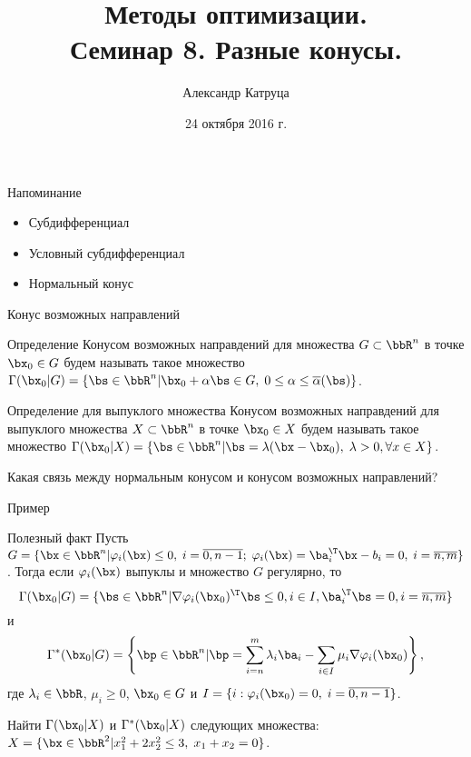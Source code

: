 \documentclass[12pt,russian]{beamer}
\title[Семинар 8]{Методы оптимизации. \\
 Семинар 8. Разные конусы.}
\author{Александр Катруца}
\institute{Московский физико-технический институт,\\
Факультет Управления и Прикладной Математики}
\date{24 октября 2016 г.}
\begin{document}
\begin{frame}
\maketitle
\end{frame}

\begin{frame}{Напоминание}
\begin{itemize}
\item Субдифференциал
\item Условный субдифференциал
\item Нормальный конус
\end{itemize}
\end{frame}

\begin{frame}{Конус возможных направлений}

\begin{block}{Определение}
Конусом возможных направдений для множества $G \subset \bbR^n$ в точке $\bx_0 \in G$ будем называть такое множество $\Gamma(\bx_0 | G) = \{ \bs \in \bbR^n | \bx_0 + \alpha\bs \in G, \; 0 \leq \alpha \leq \overline{\alpha}(\bs) \}$.
\end{block}

\begin{block}{Определение для выпуклого множества}
Конусом возможных направдений для выпуклого множества $X \subset \bbR^n$ в точке $\bx_0 \in X$ будем называть такое множество $\Gamma(\bx_0 | X) = \{ \bs \in \bbR^n | \bs = \lambda (\bx - \bx_0), \; \lambda > 0, \forall x \in X \}$.
\end{block}
Какая связь между нормальным конусом и конусом возможных направлений?

\end{frame}

\begin{frame}{Пример}
\begin{block}{Полезный факт}
Пусть $G = \{ \bx \in \bbR^n | \varphi_i(\bx) \leq 0, \; i = \overline{0,n-1}; \; \varphi_i(\bx) = \ba_i^{\T}\bx - b_i = 0, \; i = \overline{n, m} \}$. Тогда если $\varphi_i(\bx)$ выпуклы и множество $G$ регулярно, то \vspace{-4mm}
\[
\Gamma(\bx_0|G) = \{ \bs \in \bbR^n | \nabla \varphi_i(\bx_0)^{\T} \bs \leq 0, i \in I, \ba^{\T}_i \bs = 0, i = \overline{n,m} \}
\vspace{-4mm}
\]
и \vspace{-4mm}
\[
\Gamma^*(\bx_0|G) = \left \{ \bp \in \bbR^n | \bp = \sum\limits_{i = n}^m \lambda_i\ba_i - \sum\limits_{i \in I} \mu_i \nabla\varphi_i(\bx_0) \right \},
\vspace{-4mm}
\]
где $\lambda_i \in \bbR$, $\mu_i \geq 0$, $\bx_0 \in G$ и $I = \{i: \varphi_i(\bx_0) = 0, \; i = \overline{0,n-1}\}$.
\end{block}
Найти $\Gamma(\bx_0|X)$ и $\Gamma^*(\bx_0|X)$ следующих множества:
$X = \{ \bx \in \bbR^2 | x^2_1 + 2x^2_2 \leq 3, \; x_1 + x_2 = 0 \}$.
\end{frame}
\end{document}
